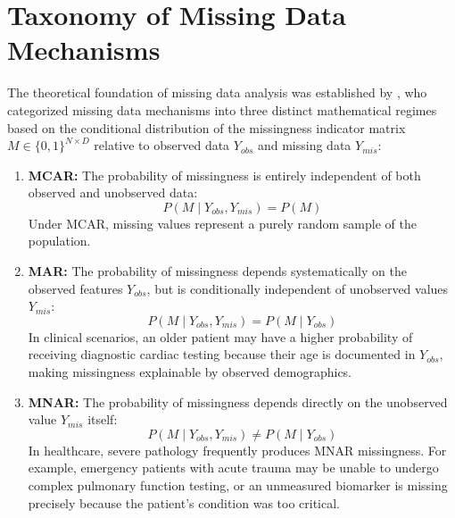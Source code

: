 \documentclass[MTech]{ugthesis}
\begin{document}
\section{Taxonomy of Missing Data Mechanisms}\label{sec:lit_taxonomy}
The theoretical foundation of missing data analysis was established by \citet{rubin1976inference}, who categorized missing data mechanisms into three distinct mathematical regimes based on the conditional distribution of the missingness indicator matrix $M \in \{0, 1\}^{N \times D}$ relative to observed data $Y_{obs}$ and missing data $Y_{mis}$:
\begin{enumerate}
    \item \textbf{\ac{MCAR}:} The probability of missingness is entirely independent of both observed and unobserved data:
    \begin{equation}
        P(M \mid Y_{obs}, Y_{mis}) = P(M)
    \end{equation}
    Under \ac{MCAR}, missing values represent a purely random sample of the population.
    \item \textbf{\ac{MAR}:} The probability of missingness depends systematically on the observed features $Y_{obs}$, but is conditionally independent of unobserved values $Y_{mis}$:
    \begin{equation}
        P(M \mid Y_{obs}, Y_{mis}) = P(M \mid Y_{obs})
    \end{equation}
    In clinical scenarios, an older patient may have a higher probability of receiving diagnostic cardiac testing because their age is documented in $Y_{obs}$, making missingness explainable by observed demographics.
    \item \textbf{\ac{MNAR}:} The probability of missingness depends directly on the unobserved value $Y_{mis}$ itself:
    \begin{equation}
        P(M \mid Y_{obs}, Y_{mis}) \neq P(M \mid Y_{obs})
    \end{equation}
    In healthcare, severe pathology frequently produces \ac{MNAR} missingness. For example, emergency patients with acute trauma may be unable to undergo complex pulmonary function testing, or an unmeasured biomarker is missing precisely because the patient's condition was too critical.
\end{enumerate}
\end{document}
